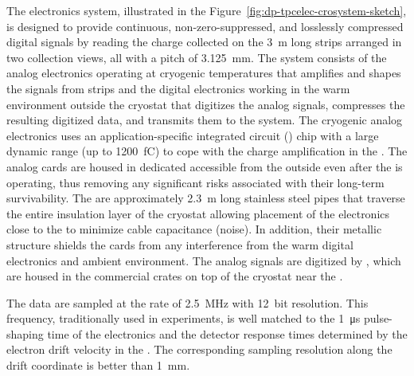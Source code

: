 The  electronics system, illustrated in the Figure~\ref{fig:dp-tpcelec-crosystem-sketch}, is designed to provide continuous, non-zero-suppressed, and losslessly compressed digital signals by reading the charge collected on the \SI{3}{m} long  strips arranged in two collection views, all with a pitch of \SI{3.125}{mm}. The system consists of the  analog electronics operating at cryogenic temperatures that amplifies and shapes the signals from  strips and the digital electronics working in the warm environment outside the cryostat that digitizes the analog signals, compresses the resulting digitized data, and transmits them to the  system.  The cryogenic  analog electronics uses an application-specific integrated circuit () chip with a large dynamic range (up to \SI{1200}{fC}) to cope with the charge amplification in the . The analog  cards are housed in dedicated  accessible from the outside even after the  is operating, thus removing any significant risks associated with their long-term survivability. The  are approximately \SI{2.3}{m} long stainless steel pipes that traverse the entire insulation layer of the cryostat allowing placement of the  electronics close to the  to minimize cable capacitance (noise).  In addition, their metallic structure shields the  cards from any interference from the warm digital electronics and ambient environment. The analog signals are digitized by , which are housed in the commercial  crates on top of the cryostat near the . 

The  data are sampled at the rate of \SI{2.5}{MHz} with \SI{12}{bit} resolution. This frequency, traditionally used in \lartpc experiments, is well matched to the \SI{1}{\micro\second} pulse-shaping time of the  electronics and the detector response times determined by the electron drift velocity in the \lar. The corresponding sampling resolution along the drift coordinate is better than \SI{1}{\mm}. 

